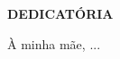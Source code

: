 \thispagestyle{plain}

\chapter*{}
\vspace{-4cm}
\begin{center}
 \textbf{DEDICATÓRIA}
\end{center}


\begin{center}

\begin{minipage}[c]{8cm}
\vspace{10cm}

À minha mãe, ...
\end{minipage}
\end{center}
